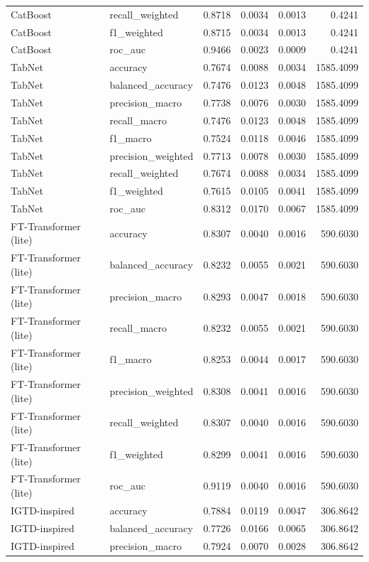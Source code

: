 \begin{tabular}{llrrrr}
CatBoost & recall_weighted & 0.8718 & 0.0034 & 0.0013 & 0.4241 \\
CatBoost & f1_weighted & 0.8715 & 0.0034 & 0.0013 & 0.4241 \\
CatBoost & roc_auc & 0.9466 & 0.0023 & 0.0009 & 0.4241 \\
TabNet & accuracy & 0.7674 & 0.0088 & 0.0034 & 1585.4099 \\
TabNet & balanced_accuracy & 0.7476 & 0.0123 & 0.0048 & 1585.4099 \\
TabNet & precision_macro & 0.7738 & 0.0076 & 0.0030 & 1585.4099 \\
TabNet & recall_macro & 0.7476 & 0.0123 & 0.0048 & 1585.4099 \\
TabNet & f1_macro & 0.7524 & 0.0118 & 0.0046 & 1585.4099 \\
TabNet & precision_weighted & 0.7713 & 0.0078 & 0.0030 & 1585.4099 \\
TabNet & recall_weighted & 0.7674 & 0.0088 & 0.0034 & 1585.4099 \\
TabNet & f1_weighted & 0.7615 & 0.0105 & 0.0041 & 1585.4099 \\
TabNet & roc_auc & 0.8312 & 0.0170 & 0.0067 & 1585.4099 \\
FT-Transformer (lite) & accuracy & 0.8307 & 0.0040 & 0.0016 & 590.6030 \\
FT-Transformer (lite) & balanced_accuracy & 0.8232 & 0.0055 & 0.0021 & 590.6030 \\
FT-Transformer (lite) & precision_macro & 0.8293 & 0.0047 & 0.0018 & 590.6030 \\
FT-Transformer (lite) & recall_macro & 0.8232 & 0.0055 & 0.0021 & 590.6030 \\
FT-Transformer (lite) & f1_macro & 0.8253 & 0.0044 & 0.0017 & 590.6030 \\
FT-Transformer (lite) & precision_weighted & 0.8308 & 0.0041 & 0.0016 & 590.6030 \\
FT-Transformer (lite) & recall_weighted & 0.8307 & 0.0040 & 0.0016 & 590.6030 \\
FT-Transformer (lite) & f1_weighted & 0.8299 & 0.0041 & 0.0016 & 590.6030 \\
FT-Transformer (lite) & roc_auc & 0.9119 & 0.0040 & 0.0016 & 590.6030 \\
IGTD-inspired & accuracy & 0.7884 & 0.0119 & 0.0047 & 306.8642 \\
IGTD-inspired & balanced_accuracy & 0.7726 & 0.0166 & 0.0065 & 306.8642 \\
IGTD-inspired & precision_macro & 0.7924 & 0.0070 & 0.0028 & 306.8642 \\

\end{tabular}

